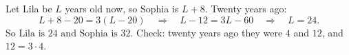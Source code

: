 Let Lila be $L$ years old now, so Sophia is $L+8$. Twenty years ago:
\[
L+8-20=3(L-20)\quad\Longrightarrow\quad L-12=3L-60\quad\Longrightarrow\quad L=24 .
\]
So $\boxed{\text{Lila is }24\text{ and Sophia is }32}$. Check: twenty years ago they were $4$ and $12$, and $12=3\cdot4$.
